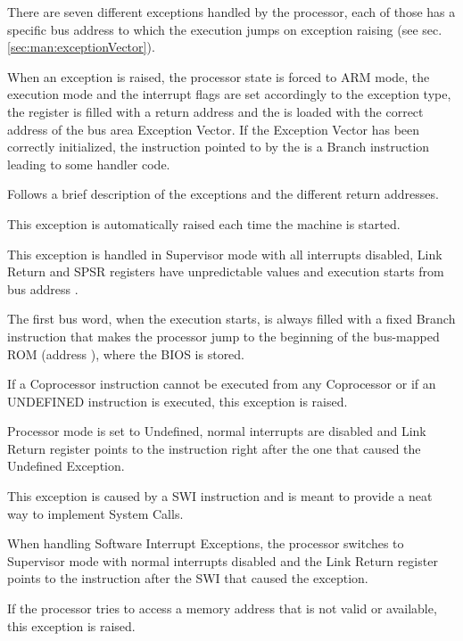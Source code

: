 \label{sec:man:hardwareExceptions}

There are seven different exceptions handled by the processor, each of those has a specific bus address to which the execution jumps on exception raising (see sec. \ref{sec:man:exceptionVector}).

When an exception is raised, the processor state is forced to ARM mode, the execution mode and the interrupt flags are set accordingly to the exception type, the  register is filled with a return address and the  is loaded with the correct address of the bus area Exception Vector. 
If the Exception Vector has been correctly initialized, the instruction pointed to by the  is a Branch instruction leading to some handler code.

Follows a brief description of the exceptions and the different return addresses.

This exception is automatically raised each time the machine is started. 

This exception is handled in Supervisor mode with all interrupts disabled, Link Return and SPSR registers have unpredictable values and execution starts from bus address .

The first bus word, when the execution starts, is always filled with a fixed Branch instruction that makes the processor jump to the beginning of the bus-mapped ROM (address ), where the BIOS is stored.

If a Coprocessor instruction cannot be executed from any Coprocessor or if an UNDEFINED instruction is executed, this exception is raised. 

Processor mode is set to Undefined, normal interrupts are disabled and Link Return register points to the instruction right after the one that caused the Undefined Exception.

This exception is caused by a SWI instruction and is meant to provide a neat way to implement System Calls. 

When handling Software Interrupt Exceptions, the processor switches to Supervisor mode with normal interrupts disabled and the Link Return register points to the instruction after the SWI that caused the exception.

If the processor tries to access a memory address that is not valid or available, this exception is raised.

